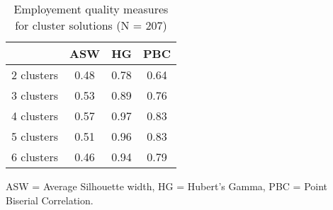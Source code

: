 \begin{table}[htp]
\footnotesize
\setlength{\tabcolsep}{35pt}
\renewcommand{\arraystretch}{1.3}
\begin{threeparttable}
\centering
\caption{Employement quality measures for cluster solutions (N = 207)} 
\label{tab:quality_clusters_job}
\begin{tabular}{lccc}
  \hline
 & ASW & HG & PBC \\ 
  \hline
2 clusters & 0.48 & 0.78 & 0.64 \\ 
  3 clusters & 0.53 & 0.89 & 0.76 \\ 
  4 clusters & 0.57 & 0.97 & 0.83 \\ 
  5 clusters & 0.51 & 0.96 & 0.83 \\ 
  6 clusters & 0.46 & 0.94 & 0.79 \\ 
   \hline
\end{tabular}
\begin{tablenotes}
\scriptsize
\item ASW = Average Silhouette width, HG = Hubert's Gamma, PBC = Point Biserial Correlation.
\end{tablenotes}
\end{threeparttable}
\end{table}
